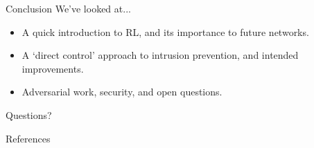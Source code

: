 \documentclass[aspectratio=169,xcolor={dvipsnames}
,hide notes
]{beamer}
\begin{document}
\begin{frame}[standout]{Conclusion}
	We've looked at...
	\begin{itemize}
		\item A quick introduction to RL, and its \alert{importance to future networks}.
		\item A `direct control' approach to intrusion prevention, and \alert{intended improvements}.
		\item Adversarial work, security, and open questions.
	\end{itemize}
	
	\alert{Questions?}
\end{frame}

\appendix

\begin{frame}[allowframebreaks]{References}
\printbibliography[heading=none]
\end{frame}
\end{document}
